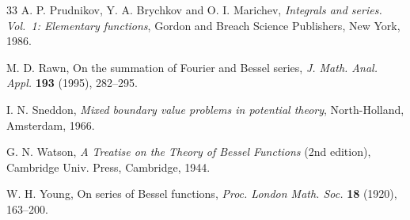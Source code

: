 \documentclass[12pt,leqno]{amsart}
\numberwithin{equation}{section}
\theoremstyle{plain}
\begin{document}
\begin{thebibliography}{33}
A. P. Prudnikov, Y. A. Brychkov and O. I. Marichev,
\textit{Integrals and series. Vol.~1: Elementary functions},
Gordon and Breach Science Publishers, New York, 1986.

M. D. Rawn,
{On the summation of Fourier and Bessel series},
\textit{J. Math. Anal. Appl.} \textbf{193} (1995), 282--295.

I. N. Sneddon,
\textit{Mixed boundary value problems in potential theory},
North-Holland, Amsterdam, 1966.

G. N. Watson,
\textit{A Treatise on the Theory of Bessel Functions} (2nd edition),
Cambridge Univ. Press,
Cambridge, 1944.

W. H. Young,
On series of Bessel functions,
\textit{Proc. London Math. Soc.} \textbf{18} (1920), 163--200.

\end{thebibliography}

\end{document}
